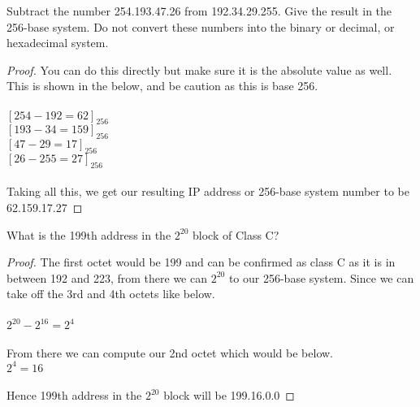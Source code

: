 \documentclass[12pt]{article}
\newenvironment{exercise}[2][Exercise]{\begin{trivlist}
\item[\hskip \labelsep {\bfseries #1}\hskip \labelsep {\bfseries #2.}]}{\end{trivlist}}
\begin{document}
\begin{exercise}{4}
Subtract the number 254.193.47.26 from 192.34.29.255. Give the result in the 256-base system. Do not convert these numbers into the binary or decimal, or hexadecimal system. 
\end{exercise}

\begin{proof}
You can do this directly but make sure it is the absolute value as well. This is shown in the below, and be caution as this is base 256. \\ \\
$[254 - 192 = 62]_{256}$ \\
$[193 - 34 = 159]_{256}$ \\  
$[47 - 29 = 17]_{256}$ \\ 
$[26 - 255 = 27]_{256}$ \\ \\
Taking all this, we get our resulting IP address or 256-base system number to be 62.159.17.27
\end{proof}

\begin{exercise}{5}
What is the 199th address in the $2^{20}$ block of Class C?
\end{exercise}

\begin{proof}
The first octet would be 199 and can be confirmed as class C as it is in between 192 and 223, from there we can $2^{20}$ to our 256-base system. Since we can take off the 3rd and 4th octets like below.  \\ \\
$2^{20} - 2^{16} = 2^{4}$ \\ \\ 
From there we can compute our 2nd octet which would be below. \\ 
$2^{4} = 16$ \\ \\
Hence 199th address in the $2^{20}$ block will be 199.16.0.0
\end{proof}
\end{document}
